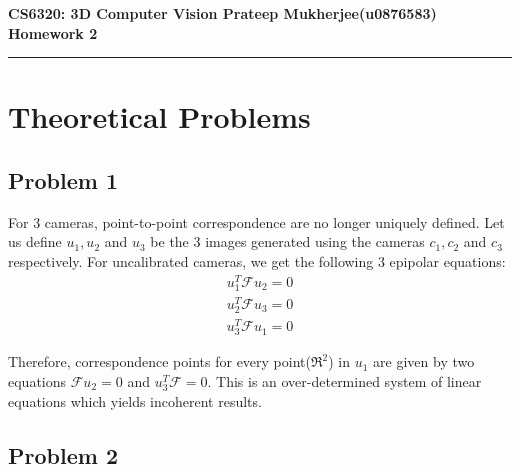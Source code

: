 \documentclass[11pt]{article}
\newcommand{\Ff}{\mathcal{F}}
\begin{document}
\thispagestyle{empty}
{\large{\bf CS6320: 3D Computer Vision \hfill Prateep Mukherjee(u0876583)}}\\

{\LARGE{\bf Homework 2}}
\vspace{0.2\baselineskip}
\hrule


  \vspace{-10pt}
\section{Theoretical Problems}
    \vspace{-10pt}
\subsection{Problem 1}

For 3 cameras, point-to-point correspondence are no longer uniquely defined.  Let us define $u_1, u_2$ and $u_3$ be the 3 images generated using the cameras $c_1,c_2$ and $c_3$ respectively. For uncalibrated cameras, we get the following 3 epipolar equations:
\vspace{-10pt}
\begin{eqnarray}
  u_1^{T} \Ff u_2 = 0 \label{eq1} \\
  u_2^{T} \Ff u_3 = 0 \label{eq2}  \\
  u_3^{T} \Ff u_1 = 0 \label{eq3}
\end{eqnarray}

Therefore, correspondence points for every point($\Re^2$) in $u_1$ are given by two equations $\Ff u_2 = 0$ and $u_3^{T} \Ff = 0$.  This is an over-determined system of linear equations which yields incoherent results. 

\subsection{Problem 2}
\end{document}
